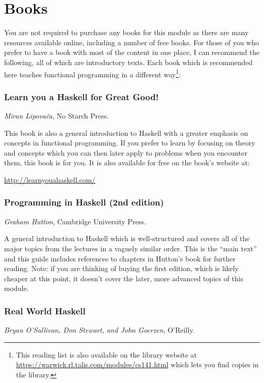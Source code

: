 \section{Books}

You are not required to purchase any books for this module as there are many resources available online, including a number of free books. For those of you who prefer to have a book with most of the content in one place, I can recommend the following, all of which are introductory texts. Each book which is recommended here teaches functional programming in a different way\footnote{This reading list is also available on the library website at \url{https://warwick.rl.talis.com/modules/cs141.html} which lets you find copies in the library.}:

\subsubsection{Learn you a Haskell for Great Good!} \vspace{-0.5cm}
\emph{Miran Lipova\v{c}a}, No Starch Press. 

This book is also a general introduction to Haskell with a greater emphasis on concepts in functional programming. If you prefer to learn by focusing on theory and concepts which you can then later apply to problems when you encounter them, this book is for you. It is also available for free on the book's website at:
\begin{center}
	\url{http://learnyouahaskell.com/}
\end{center} 

\subsubsection{Programming in Haskell (2nd edition)} \vspace{-0.5cm}
\emph{Graham Hutton}, Cambridge University Press. 

A general introduction to Haskell which is well-structured and covers all of the major topics from the lectures in a vaguely similar order. This is the ``main text'' and this guide includes references to chapters in Hutton's book for further reading. Note: if you are thinking of buying the first edition, which is likely cheaper at this point, it doesn't cover the later, more advanced topics of this module.

\subsubsection{Real World Haskell} \vspace{-0.5cm}
\emph{Bryan O'Sullivan, Don Stewart, and John Goerzen}, O'Reilly.


